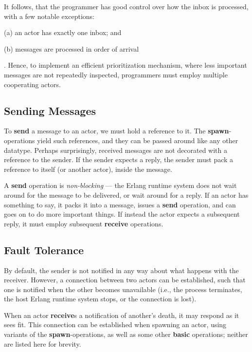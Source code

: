 It follows, that the programmer has good control over how the inbox is
processed, with a few notable exceptions: \begin{inparaenum}\item[(a)]
an actor has exactly one inbox; and \item[(b)] messages are processed
in order of arrival\end{inparaenum}.  Hence, to implement an efficient
prioritization mechanism, where less important messages are not
repeatedly inspected, programmers must employ multiple cooperating
actors.

\subsection*{Sending Messages}

To \textbf{send} a message to an actor, we must hold a reference to it.
The \textbf{spawn}-operations yield such references, and they can be
passed around like any other datatype. Perhaps surprisingly, received
messages are not decorated with a reference to the sender. If the
sender expects a reply, the sender must pack a reference to itself (or
another actor), inside the message.

A \textbf{send} operation is \emph{non-blocking} --- the Erlang
runtime system does not wait around for the message to be delivered,
or wait around for a reply. If an actor has something to say, it packs
it into a message, issues a \textbf{send} operation, and can goes on
to do more important things. If instead the actor expects a subsequent
reply, it must employ subsequent \textbf{receive} operations.

\subsection*{Fault Tolerance}

By default, the sender is not notified in any way about what happens
with the receiver. However, a connection between two actors can be
established, such that one is notified when the other becomes
unavailable (i.e., the process terminates, the host Erlang runtime
system stops, or the connection is lost).

When an actor \textbf{receive}s a notification of another's death, it
may respond as it sees fit. This connection can be established when
spawning an actor, using variants of the \textbf{spawn}-operations, as
well as some other \textbf{basic} operations; neither are listed here
for brevity.

